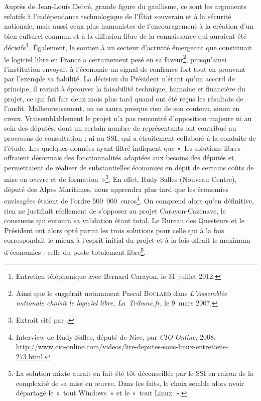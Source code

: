 \documentclass{FramateX}
\begin{document}
\begin{refsection}
Auprès de Jean-Louis Debré, grande figure du gaullisme, ce sont les
arguments relatifs à l'indépendance technologique de l'État souverain
et à la sécurité nationale, mais aussi ceux plus humanistes de
l'encouragement à la création d'un bien culturel commun et à la
diffusion libre de la connaissance qui auraient été
décisifs\footnote{Entretien téléphonique avec Bernard Carayon, le
31~juillet 2012.}. Également, le soutien à un secteur d'activité
émergeant que constituait le logiciel libre en France a certainement
pesé en sa faveur\footnote{Ainsi que le suggérait notamment Pascal \textsc{Boulard} dans \textit{L'Assemblée nationale choisit le logiciel libre,}
\textit{La~Tribune.fr}, le 9~mars 2007.}, puisqu'ainsi l'institution envoyait à
l'économie un signal de confiance fort tout en prouvant par l'exemple
sa fiabilité. La décision du Président n'étant qu'un accord de
principe, il restait à éprouver la faisabilité technique, humaine et
financière du projet, ce qui fut fait deux mois plus tard quand ont été
reçus les résultats de l'audit. Malheureusement, on ne saura presque
rien de son contenu, sinon en creux. Vraisemblablement le projet n'a
pas rencontré d'opposition majeure ni au sein des députés, dont un
certain nombre de représentants ont contribué au processus de
consultation ; ni au SSI, qui a étroitement collaboré à la conduite de
l'étude. Les quelques données ayant filtré indiquent que «~les
solutions libres offraient désormais des fonctionnalités adaptées aux
besoins des députés et permettaient de réaliser de substantielles
économies en dépit de certains coûts de mise en œuvre et de
formation~»\footnote{Extrait cité par \cite{Guillemin2007}.}. En effet, Rudy Salles (Nouveau Centre),
député des Alpes Maritimes, nous apprendra plus tard que les économies
envisagées étaient de l'ordre 500~000~euros\footnote{Interview de Rudy
Salles, député de Nice, par \textit{CIO Online}, 2008. \url{http://www.cio-online.com/videos/lire-deputes-sous-linux-entretiens-273.html}.}. On comprend alors qu'en définitive, rien
ne justifiait réellement de s'opposer au projet Carayon-Cazenave, le
consensus qui entoura sa validation étant total. Le Bureau des
Questeurs et le Président ont alors opté parmi les trois solutions pour
celle qui à la fois correspondait le mieux à l'esprit initial du projet
et à la fois offrait le maximum d'économies : celle du poste totalement
libre\footnote{La solution mixte aurait en fait été tôt déconseillée
par le SSI en raison de la complexité de sa mise en œuvre. Dans les
faits, le choix semble alors avoir départagé le «~tout Windows~» et le
«~tout Linux~».}. 


\end{refsection}
\end{document}
